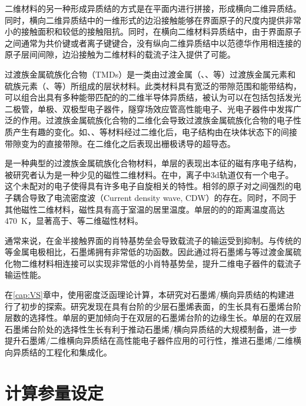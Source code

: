 二维材料的另一种形成异质结的方式是在平面内进行拼接，形成横向二维异质结。同时，横向二维异质结中的一维形式的边沿接触能够在界面原子的尺度内提供非常小的接触面积和较低的接触阻抗。同时，在横向二维材料异质结中，由于界面原子之间通常为共价键或者离子键键合，没有纵向二维异质结中以范德华作用相连接的原子层间间隙，边沿接触为二维材料的载流子注入提供了可能。

过渡族金属硫族化合物（TMDs）是一类由过渡金属（、、等）过渡族金属元素和硫族元素（、等）所组成的层状材料。此类材料具有宽泛的带隙范围和能带结构，可以组合出具有多种能带匹配的的二维半导体异质结，被认为可以在包括包括发光二极管，单极、双极型电子器件，隧穿场效应管高性能电子、光电子器件中发挥广泛的作用。过渡族金属硫族化合物的二维化会导致过渡族金属硫族化合物的电子性质产生有趣的变化。如、、等材料经过二维化后，电子结构由在块体状态下的间接带隙变为的直接带隙。在二维化之后表现出栅极诱导的超导态。

是一种典型的过渡族金属硫族化合物材料，单层的表现出本征的磁有序电子结构，被研究者认为是一种少见的磁性二维材料。在中，离子中3d轨道仅有一个电子。这个未配对的电子使得具有许多电子自旋相关的特性。相邻的原子对之间强烈的电子耦合导致了电流密度波（Current density wave, CDW）的存在。同时，不同于其他磁性二维材料，磁性具有高于室温的居里温度。单层的的的距离温度高达\SI{470}{\kelvin}，显著高于、等二维磁性材料。

通常来说，在金半接触界面的肖特基势垒会导致载流子的输运受到抑制。与传统的等金属电极相比，石墨烯拥有非常低的功函数。因此通过将石墨烯与等过渡金属硫化物二维材料相连接可以实现非常低的小肖特基势垒，提升二维电子器件的载流子输运性能。

在\ref{cap:VS}章中，使用密度泛函理论计算，本研究对石墨烯/横向异质结的构建进行了初步的探索。研究发现在具有台阶的少层石墨烯表面，的生长具有石墨烯台阶层数的选择性。单层的更加倾向于在双层的石墨烯台阶的边缘生长。单层的在双层石墨烯台阶处的选择性生长有利于推动石墨烯/横向异质结的大规模制备，进一步提升石墨烯/二维横向异质结在高性能电子器件应用的可行性，推进石墨烯/二维横向异质结的工程化和集成化。

\section{计算参量设定}

